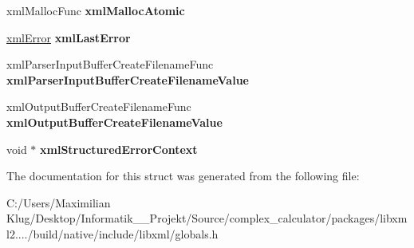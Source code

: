 \begin{DoxyCompactItemize}
xml\+Malloc\+Func {\bfseries xml\+Malloc\+Atomic}
\item 
\mbox{\label{struct__xml_global_state_afd5f9c9dc58ab8f75fb0074370e18bbb}} 
\mbox{\hyperlink{struct__xml_error}{xml\+Error}} {\bfseries xml\+Last\+Error}
\item 
\mbox{\label{struct__xml_global_state_a4426a58b33b2f1db58f66c4a01d1044c}} 
xml\+Parser\+Input\+Buffer\+Create\+Filename\+Func {\bfseries xml\+Parser\+Input\+Buffer\+Create\+Filename\+Value}
\item 
\mbox{\label{struct__xml_global_state_ad9c2ba58bc1b222cd1189a265a137276}} 
xml\+Output\+Buffer\+Create\+Filename\+Func {\bfseries xml\+Output\+Buffer\+Create\+Filename\+Value}
\item 
\mbox{\label{struct__xml_global_state_a2946a64156d7b48ddb2002f1cabf36c6}} 
void $\ast$ {\bfseries xml\+Structured\+Error\+Context}
\end{DoxyCompactItemize}


The documentation for this struct was generated from the following file\+:\begin{DoxyCompactItemize}
\item 
C\+:/\+Users/\+Maximilian Klug/\+Desktop/\+Informatik\+\_\+\_\+\+Projekt/\+Source/complex\+\_\+calculator/packages/libxml2..../build/native/include/libxml/globals.\+h\end{DoxyCompactItemize}
